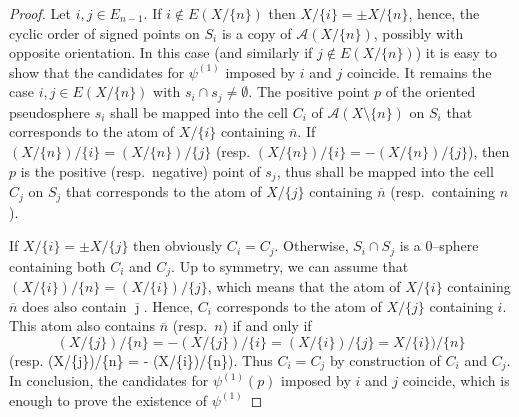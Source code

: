 \documentclass[a4paper]{amsart}
\theoremstyle{definition}
\theoremstyle{remark}
\begin{document}
\begin{proof}
  Let $i,j\in E_{n-1}$. If $i\not\in E(X/\{n\})$ then $X/\{i\} = \pm
  X/\{n\}$, hence, the cyclic order of signed points on $S_i$ is a copy
  of $\mathcal A(X/\{n\})$, possibly with opposite orientation. In this
  case (and similarly if $j\not\in E(X/\{n\})$) it is easy to show that
  the candidates for $\psi^{(1)}$ imposed by $i$ and $j$ coincide. 
%
 It remains the case $i,j\in E(X/\{n\})$ with $s_i\cap s_j\not=\emptyset$.
 The positive point $p$ of the oriented pseudosphere $s_i$ shall be mapped
 into the cell $C_i$ of  $\mathcal A(X\setminus \{n\})$ on $S_i$ that
 corresponds  to the atom of $X/\{i\}$ containing $\overline n$. 
 If $(X/\{n\})\big/\{i\} = (X/\{n\})\big/\{j\}$
 (resp. $(X/\{n\})\big/\{i\} = -(X/\{n\})\big/\{j\}$), then $p$ is the
 positive (resp.\ negative) point of $s_j$, thus shall be
  mapped into the cell $C_j$ on $S_j$ that corresponds to the atom of
  $X/\{j\}$ containing $\overline n$ (resp.\  containing $n$). 

 If $X/\{i\} = \pm X/\{j\}$ then obviously $C_i=C_j$. Otherwise,
 $S_i\cap S_j$ is a $0$--sphere containing both $C_i$  and $C_j$. Up to
 symmetry, we can assume that $(X/\{i\})\big/\{n\}=(X/\{i\})\big/\{j\}$,
 which means that the atom of $X/\{i\}$ containing $\overline n$ does
 also contain $\overline \jmath$. Hence, $C_i$ corresponds to the atom of $X/\{j\}$
 containing $i$. This atom also contains $\overline n$ (resp.\ $n$) if
 and only if  
 $$  (X/\{j\})\big/\{n\} = - (X/\{j\})\big/\{i\} = (X/\{i\})\big/\{j\} =
 X/\{i\})\big/\{n\}$$
 (resp. (X/\{j\})\big/\{n\} = - (X/\{i\})\big/\{n\}). Thus $C_i= C_j$ by
 construction of $C_i$ and $C_j$. 
%
 In conclusion, the candidates for $\psi^{(1)}(p)$ imposed by $i$ and $j$
 coincide, which is enough to prove the existence of $\psi^{(1)}$
\end{proof}
\end{document}
